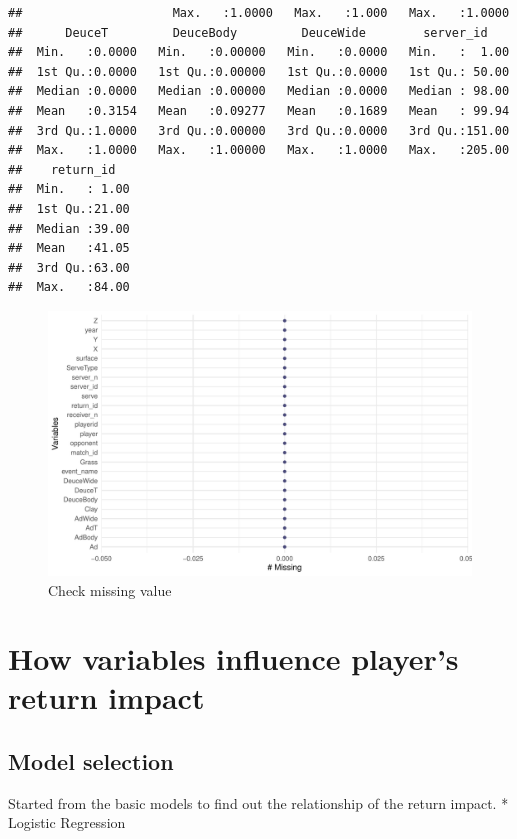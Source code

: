 \documentclass[11pt,a4paper,]{article}
\begin{document}
\begin{verbatim}
##                     Max.   :1.0000   Max.   :1.000   Max.   :1.0000  
##      DeuceT         DeuceBody         DeuceWide        server_id     
##  Min.   :0.0000   Min.   :0.00000   Min.   :0.0000   Min.   :  1.00  
##  1st Qu.:0.0000   1st Qu.:0.00000   1st Qu.:0.0000   1st Qu.: 50.00  
##  Median :0.0000   Median :0.00000   Median :0.0000   Median : 98.00  
##  Mean   :0.3154   Mean   :0.09277   Mean   :0.1689   Mean   : 99.94  
##  3rd Qu.:1.0000   3rd Qu.:0.00000   3rd Qu.:0.0000   3rd Qu.:151.00  
##  Max.   :1.0000   Max.   :1.00000   Max.   :1.0000   Max.   :205.00  
##    return_id    
##  Min.   : 1.00  
##  1st Qu.:21.00  
##  Median :39.00  
##  Mean   :41.05  
##  3rd Qu.:63.00  
##  Max.   :84.00
\end{verbatim}

\begin{figure}
\includegraphics[width=1\linewidth]{Report_files/figure-latex/tidymiss-1} \caption{Check missing value}\label{fig:tidymiss}
\end{figure}

\hypertarget{how-variables-influence-players-return-impact}{%
\section{How variables influence player's return impact}\label{how-variables-influence-players-return-impact}}

\hypertarget{model-selection}{%
\subsection{Model selection}\label{model-selection}}

Started from the basic models to find out the relationship of the return impact.
* Logistic Regression
\end{document}
